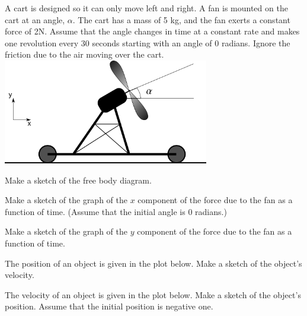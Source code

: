 \begin{problem}
\item A cart is designed so it can only move left and right. A fan is
  mounted on the cart at an angle, $\alpha$. The cart has a mass of 5
  kg, and the fan exerts a constant force of 2N. Assume that the angle
  changes in time at a constant rate and makes one revolution every 30
  seconds starting with an angle of 0 radians. Ignore the friction due
  to the air moving over the cart.  \\
  \includegraphics[width=9cm]{ink/week6/airCart}
  \begin{subproblem}
    \item Make a sketch of the free body diagram.
      \vspace{10em}
    \item Make a sketch of the graph of the $x$ component of the force
      due to the fan as a function of time.  (Assume that the initial
      angle is 0 radians.)

      \vfill

    \item Make a sketch of the graph of the $y$ component of the force
      due to the fan as a function of time.
      \vfill
      \clearpage
    \item The position of an object is given in the plot below. Make
      a sketch of the object's velocity. \\
      \scalebox{0.65}{}

    \item The velocity of an object is given in the plot below. Make
      a sketch of the object's position. Assume that the initial position
      is negative one. \\
      \scalebox{0.65}{}


\end{subproblem}
\end{problem}
